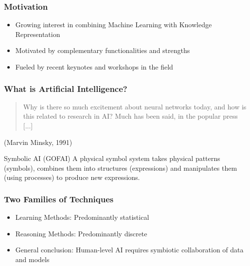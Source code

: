\documentclass{beamer}
\begin{document}
\begin{frame}
\frametitle{Motivation}
\begin{itemize}
\item Growing interest in combining Machine Learning with Knowledge
  Representation
\item Motivated by complementary functionalities and strengths
\item Fueled by recent keynotes and workshops in the field
\end{itemize}
\end{frame}

\begin{frame}
  \frametitle{What is Artificial Intelligence?}
  \begin{quote}
    Why is there so much excitement about neural networks today, and
    how is this related to research in AI? Much has been said, in
    the popular press [...]
  \end{quote}
  \pause
  (Marvin Minsky, 1991)
  \pause
  \begin{block}{Symbolic AI (GOFAI)}
    A physical symbol system takes physical patterns (symbols),
    combines them into structures (expressions) and manipulates them
    (using processes) to produce new expressions.
  \end{block}
\end{frame}

\begin{frame}
\frametitle{Two Families of Techniques}
\begin{itemize}
\item Learning Methods: Predominantly statistical
\item Reasoning Methods: Predominantly discrete
\item General conclusion: Human-level AI requires symbiotic
  collaboration of data and models
\end{itemize}
\end{frame}
\end{document}
